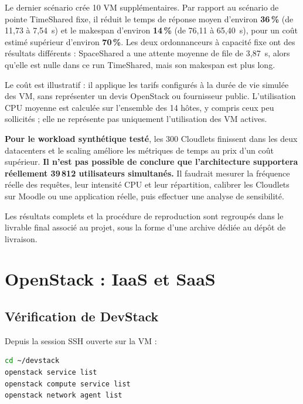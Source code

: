\documentclass[11pt,a4paper]{article}
\begin{document}
Le dernier scénario crée 10 VM supplémentaires. Par rapport au scénario de pointe TimeShared fixe, il réduit le temps de réponse moyen d'environ \textbf{36\,\%} (de 11,73 à 7,54~s) et le makespan d'environ \textbf{14\,\%} (de 76,11 à 65,40~s), pour un coût estimé supérieur d'environ \textbf{70\,\%}. Les deux ordonnanceurs à capacité fixe ont des résultats différents : SpaceShared a une attente moyenne de file de 3,87~s, alors qu'elle est nulle dans ce run TimeShared, mais son makespan est plus long.

Le coût est illustratif : il applique les tarifs configurés à la durée de vie simulée des VM, sans représenter un devis OpenStack ou fournisseur public. L'utilisation CPU moyenne est calculée sur l'ensemble des 14 hôtes, y compris ceux peu sollicités ; elle ne représente pas uniquement l'utilisation des VM actives.

\begin{remarque}
\textbf{Pour le workload synthétique testé}, les 300 Cloudlets finissent dans les deux datacenters et le scaling améliore les métriques de temps au prix d'un coût supérieur. \textbf{Il n'est pas possible de conclure que l'architecture supportera réellement 39\,812 utilisateurs simultanés.} Il faudrait mesurer la fréquence réelle des requêtes, leur intensité CPU et leur répartition, calibrer les Cloudlets sur Moodle ou une application réelle, puis effectuer une analyse de sensibilité.
\end{remarque}

Les résultats complets et la procédure de reproduction sont regroupés dans le livrable final associé au projet, sous la forme d'une archive dédiée au dépôt de livraison.

\clearpage

\section{OpenStack : IaaS et SaaS}

\subsection{Vérification de DevStack}
Depuis la session SSH ouverte sur la VM :
\begin{lstlisting}[language=bash]
cd ~/devstack
openstack service list
openstack compute service list
openstack network agent list
\end{lstlisting}
\end{document}
